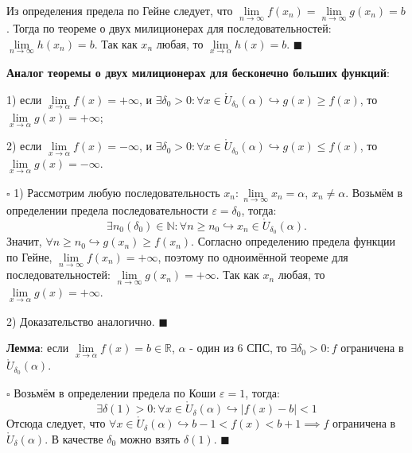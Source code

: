 \documentclass[12pt, a4paper, reqno]{article}
\begin{document}
    Из определения предела по Гейне следует, что $\lim\limits_{n\to\infty} f(x_n) =
    \lim\limits_{n\to\infty} g(x_n) = b$. Тогда по теореме о двух милиционерах для
    последовательностей: $\lim\limits_{n\to\infty} h(x_n) = b$. Так как $x_n$ любая, то
    $\lim\limits_{x\to\alpha} h(x) = b$. $\blacksquare$

    \textbf{Аналог теоремы о двух милиционерах для бесконечно больших функций}:

    1) если $\lim\limits_{x\to\alpha} f(x) = +\infty$, и $\exists\delta_0 > 0: \forall x\in\mathring
    U_{\delta_0}(\alpha)\hookrightarrow g(x) \geq f(x)$, то $\lim\limits_{x\to\alpha} g(x) =
    +\infty$;

    2) если $\lim\limits_{x\to\alpha} f(x) = -\infty$, и $\exists\delta_0 > 0: \forall x\in\mathring
    U_{\delta_0}(\alpha)\hookrightarrow g(x) \leq f(x)$, то $\lim\limits_{x\to\alpha} g(x) =
    -\infty$.

    $\square$ 1) Рассмотрим любую последовательность $x_n: \lim\limits_{n\to\infty} x_n = \alpha$,
    $x_n \neq \alpha$. Возьмём в определении предела последовательности $\varepsilon = \delta_0$,
    тогда:
    \begin{equation*}
        \exists n_0(\delta_0)\in\mathbb{N}: \forall n\geq n_0\hookrightarrow x_n\in \mathring
        U_{\delta_0}(\alpha).
    \end{equation*}
    Значит, $\forall n\geq n_0\hookrightarrow g(x_n) \geq f(x_n)$. Согласно определению предела
    функции по Гейне, $\lim\limits_{n\to\infty} f(x_n) = +\infty$, поэтому по одноимённой теореме
    для последовательностей: $\lim\limits_{n\to\infty} g(x_n) = +\infty$. Так как $x_n$ любая, то
    $\lim\limits_{x\to\alpha} g(x) = +\infty$.

    2) Доказательство аналогично. $\blacksquare$

    \textbf{Лемма}: если $\lim\limits_{x\to\alpha} f(x) = b\in\mathbb{R}$, $\alpha$ - один из 6 СПС,
    то $\exists\delta_0 > 0: f$ ограничена в $\mathring U_{\delta_0}(\alpha)$.

    $\square$ Возьмём в определении предела по Коши $\varepsilon = 1$, тогда:
    \begin{equation*}
        \exists\delta(1) > 0: \forall x\in\mathring U_{\delta}(\alpha) \hookrightarrow
        |f(x) - b| < 1
    \end{equation*}
    Отсюда следует, что $\forall x\in\mathring U_{\delta}(\alpha) \hookrightarrow b - 1 < f(x) <
    b + 1 \implies f$ ограничена в $\mathring U_{\delta}(\alpha)$. В качестве $\delta_0$ можно взять
    $\delta(1)$. $\blacksquare$
\end{document}
